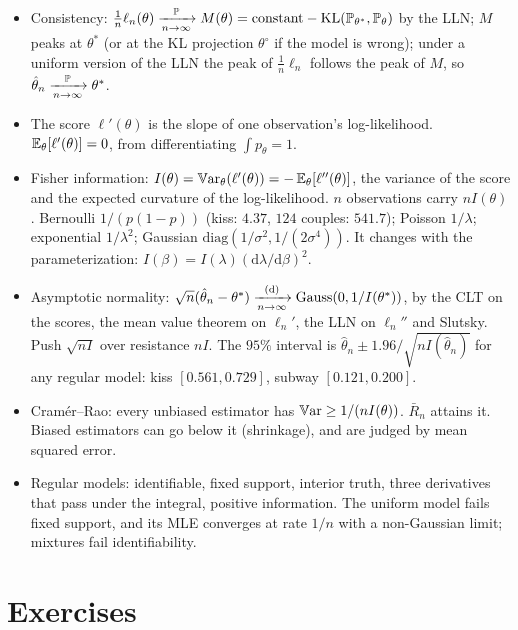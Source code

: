 \begin{itemize}[nosep]
\item Consistency: $\frac1n\ell_n(\theta) \xrightarrow [n \to \infty ]{\mathbb{P}} M(\theta) = \text{constant} - \mathrm{KL}(\mathbb{P}_{\theta^*}, \mathbb{P}_\theta)$ by the LLN; $M$ peaks at $\theta^*$ (or at the KL projection $\theta^\circ$ if the model is wrong); under a uniform version of the LLN the peak of $\frac1n\ell_n$ follows the peak of $M$, so $\hat{\theta}_n \xrightarrow [n \to \infty ]{\mathbb{P}} \theta^*$.
\item The score $\ell'(\theta)$ is the slope of one observation's log-likelihood. $\operatorname*{\mathbb{E}}_\theta[\ell'(\theta)] = 0$, from differentiating $\int p_\theta = 1$.
\item Fisher information: $I(\theta) = \operatorname*{\mathbb{V}\text{ar}}_\theta(\ell'(\theta)) = -\operatorname*{\mathbb{E}}_\theta[\ell''(\theta)]$, the variance of the score and the expected curvature of the log-likelihood. $n$ observations carry $nI(\theta)$. Bernoulli $1/(p(1-p))$ (kiss: $4.37$, $124$ couples: $541.7$); Poisson $1/\lambda$; exponential $1/\lambda^2$; Gaussian $\mathrm{diag}(1/\sigma^2, 1/(2\sigma^4))$. It changes with the parameterization: $I(\beta) = I(\lambda)(\mathrm{d}\lambda/\mathrm{d}\beta)^2$.
\item Asymptotic normality: $\sqrt{n}(\hat{\theta}_n - \theta^*) \xrightarrow [n \to \infty ]{\text{(d)}} \text{Gauss}(0, 1/I(\theta^*))$, by the CLT on the scores, the mean value theorem on $\ell_n'$, the LLN on $\ell_n''$ and Slutsky. Push $\sqrt{nI}$ over resistance $nI$. The $95\%$ interval is $\hat{\theta}_n \pm 1.96/\sqrt{nI(\hat{\theta}_n)}$ for any regular model: kiss $[0.561, 0.729]$, subway $[0.121, 0.200]$.
\item Cram\'er--Rao: every unbiased estimator has $\operatorname*{\mathbb{V}\text{ar}} \geq 1/(nI(\theta))$. $\bar{R}_n$ attains it. Biased estimators can go below it (shrinkage), and are judged by mean squared error.
\item Regular models: identifiable, fixed support, interior truth, three derivatives that pass under the integral, positive information. The uniform model fails fixed support, and its MLE converges at rate $1/n$ with a non-Gaussian limit; mixtures fail identifiability.
\end{itemize}

\section{Exercises}
\label{sec:mle-exercises}


